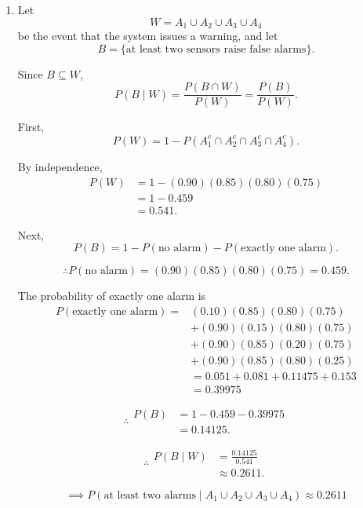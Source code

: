 \documentclass[12pt]{article}
\begin{document}
\begin{enumerate}
    \item[(a)]
    Let
    \[
    W=A_1\cup A_2\cup A_3\cup A_4
    \]
    be the event that the system issues a warning, and let
    \[
    B=\{\text{at least two sensors raise false alarms}\}.
    \]

    Since $B\subseteq W$,
    \[
    P(B\mid W)
    =
    \frac{P(B\cap W)}{P(W)}
    =
    \frac{P(B)}{P(W)}.
    \]

    First,
    \[
    P(W)
    =
    1-P(A_1^c\cap A_2^c\cap A_3^c\cap A_4^c).
    \]

    By independence,
    \[
    \begin{aligned}
    P(W)
    &=
    1-(0.90)(0.85)(0.80)(0.75)\\
    &=
    1-0.459\\
    &=
    0.541.
    \end{aligned}
    \]

    Next,
    \[
    P(B)
    =
    1-P(\text{no alarm})-P(\text{exactly one alarm}).
    \]

    \[
    \therefore
    P(\text{no alarm})
    =
    (0.90)(0.85)(0.80)(0.75)
    =
    0.459.
    \]

    The probability of exactly one alarm is
    \[
    \begin{aligned}
    P(\text{exactly one alarm})
    ={}&
    (0.10)(0.85)(0.80)(0.75)\\
    &+(0.90)(0.15)(0.80)(0.75)\\
    &+(0.90)(0.85)(0.20)(0.75)\\
    &+(0.90)(0.85)(0.80)(0.25)\\
    &=
    0.051+0.081+0.11475+0.153\\
    &=
    0.39975
    \end{aligned}
    \]

    \[
    \therefore
    \begin{aligned}
    P(B)
    &=
    1-0.459-0.39975\\
    &=
    0.14125.
    \end{aligned}
    \]

    \[
    \therefore
    \begin{aligned}
    P(B\mid W)
    &=
    \frac{0.14125}{0.541}\\
    &\approx 0.2611.
    \end{aligned}
    \]

    \[
    \implies
    P(\text{at least two alarms}\mid A_1\cup A_2\cup A_3\cup A_4)
    \approx 0.2611
    \]


\end{enumerate}
\end{document}
